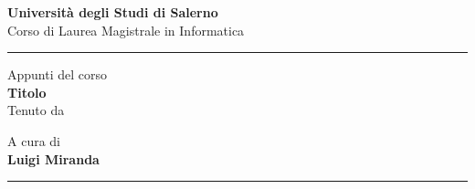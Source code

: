 \begin{titlepage} %
\begin{Large}
 \begin{center}
 \huge{ \bf Università degli Studi di Salerno\\ }
    \vspace{1mm}
	\large{{Corso di Laurea Magistrale in Informatica\\}}
    \vspace{2mm}
    \hrule %

    \vfill
    {{Appunti del corso}}\\
	\vspace{2mm}
	{\huge{\bf Titolo}}\\
    \vspace{2mm}
     \small{Tenuto da \\ \bf }
 \vspace{2mm}
     \small{}
\end{center}
\end{Large}

\vfill
\begin{flushright}
   A cura di\\
    \bf Luigi Miranda
\end{flushright}

\hrule
\vspace{2mm}
\end{titlepage}